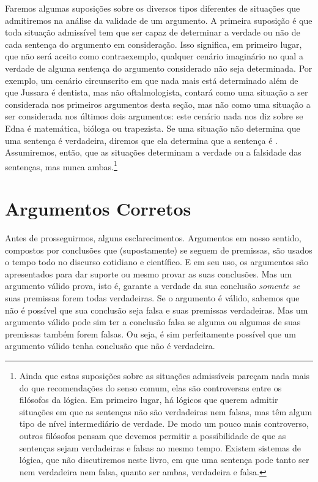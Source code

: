 Faremos algumas suposições sobre os diversos tipos diferentes de situações que admitiremos na análise da validade de um argumento.
A primeira suposição é que toda situação admissível tem que ser capaz de determinar a verdade ou não de cada sentença do argumento em consideração.
Isso significa, em primeiro lugar, que não será aceito como contraexemplo, qualquer cenário imaginário no qual a verdade de alguma sentença do argumento considerado não seja determinada.
Por exemplo, um cenário circunscrito em que nada mais está determinado além de que Jussara é dentista, mas não oftalmologista, contará como uma situação a ser considerada nos primeiros argumentos desta seção, mas não como uma situação a ser considerada nos últimos dois argumentos:
este cenário nada nos diz sobre se Edna é matemática, bióloga ou trapezista.
Se uma situação não determina que uma sentença é verdadeira, diremos que ela determina que a sentença é .
Assumiremos, então, que as situações determinam a verdade ou a falsidade das sentenças, mas nunca ambas.\footnote{
	Ainda que estas suposições sobre as situações admissíveis pareçam nada mais do que recomendações do senso comum, elas são controversas entre os filósofos da lógica.
Em primeiro lugar, há lógicos que querem admitir situações em que as sentenças não são verdadeiras nem falsas, mas têm algum tipo de nível intermediário de verdade.
De modo um pouco mais controverso, outros filósofos pensam que devemos permitir a possibilidade de que as sentenças sejam verdadeiras e falsas ao mesmo tempo. Existem sistemas de lógica, que não discutiremos neste livro, em que uma sentença pode tanto ser nem verdadeira nem falsa, quanto ser ambas, verdadeira e falsa.}


\section{Argumentos Corretos}

Antes de prosseguirmos, alguns esclarecimentos.
Argumentos em nosso sentido, compostos por conclusões que (supostamente) se seguem de premissas, são usados o tempo todo no discurso cotidiano e científico.
E em seu uso, os argumentos são apresentados para dar suporte ou mesmo provar as suas conclusões.
Mas um argumento válido prova, isto é, garante a verdade da sua conclusão \emph{somente se} suas premissas forem todas verdadeiras.
Se o argumento é válido, sabemos que não é possível que sua conclusão seja falsa e suas premissas verdadeiras.
Mas um argumento válido pode sim ter a conclusão falsa se alguma ou algumas de suas premissas também forem falsas.
Ou seja, é sim perfeitamente possível que um argumento válido tenha conclusão que não é verdadeira.

